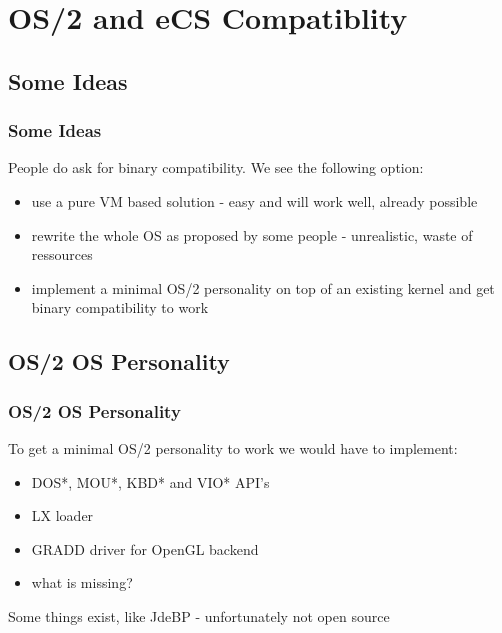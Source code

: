\documentclass[handout]{beamer}
\begin{document}
\section{OS/2 and eCS Compatiblity}
\subsection{Some Ideas}
\begin{frame}
\frametitle{Some Ideas}
	People do ask for binary compatibility. We see the following option:
	\begin{itemize}
      \item use a pure VM based solution - easy and will work well, already possible
      \item rewrite the whole OS as proposed by some people - unrealistic, waste of ressources
      \item implement a minimal OS/2 personality on top of an existing kernel and get binary compatibility to work
	\end{itemize}
\end{frame}

\subsection{OS/2 OS Personality}
\begin{frame}
\frametitle{OS/2 OS Personality}
	To get a minimal OS/2 personality to work we would have to implement:
	\begin{itemize}
      \item DOS*, MOU*, KBD* and VIO* API's
      \item LX loader
      \item GRADD driver for OpenGL backend
      \item what is missing?
    \end{itemize}
	Some things exist, like JdeBP - unfortunately not open source
\end{frame}
\end{document}

